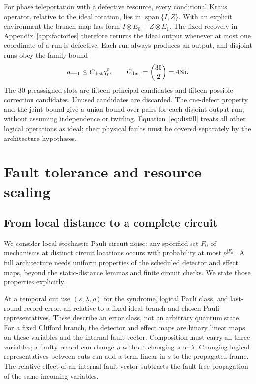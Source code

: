 For phase teleportation with a defective resource, every conditional Kraus
operator, relative to the ideal rotation, lies in
$\operatorname{span}\{I,Z\}$. With an explicit environment the branch map
has form $I\otimes E_0+Z\otimes E_1$. The fixed recovery in
Appendix~\ref{app:factories} therefore returns the ideal output whenever at
most one coordinate of a run is defective. Each run always produces an
output, and disjoint runs obey the family bound
\begin{equation}
 q_{r+1}\le C_{\rm dist}q_r^2,\qquad
 C_{\rm dist}=\binom{30}{2}=435.
 \label{eq:distill}
\end{equation}
The 30 preassigned slots are fifteen principal candidates and fifteen
possible correction candidates. Unused candidates are discarded. The
one-defect property and the joint bound give a union bound over pairs for
each disjoint output run, without assuming independence or twirling.
Equation~\eqref{eq:distill} treats all other logical operations as ideal;
their physical faults must be covered separately by the architecture
hypotheses.

\section{Fault tolerance and resource scaling}
\label{sec:ft-main}
\subsection{From local distance to a complete circuit}
We consider local-stochastic Pauli circuit noise: any specified set $F_0$
of mechanisms at distinct circuit locations occurs with probability at
most $p^{|F_0|}$. A full architecture needs uniform properties of the
scheduled detector and effect maps, beyond the static-distance lemmas and
finite circuit checks. We state those properties explicitly.

At a temporal cut use $(s,\lambda,\rho)$ for the syndrome, logical Pauli
class, and last-round record error, all relative to a fixed ideal branch
and chosen Pauli representatives. These describe an error class, not an
arbitrary quantum state. For a fixed Clifford branch, the detector and
effect maps are binary linear maps on these variables and the internal
fault vector. Composition must carry all three variables; a faulty record
can change $\rho$ without changing $s$ or $\lambda$. Changing logical
representatives between cuts can add a term linear in $s$ to the propagated
frame. The relative effect of an internal fault vector subtracts the
fault-free propagation of the same incoming variables.


